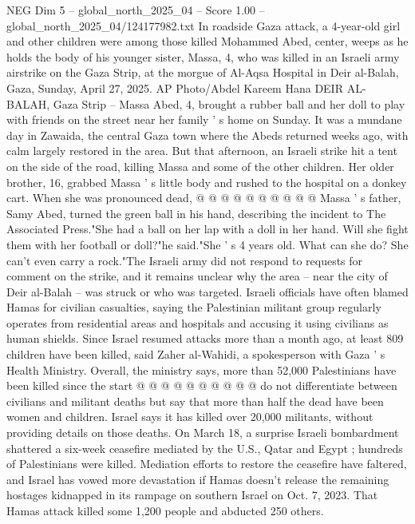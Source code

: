 \begin{textsample}{NEG Dim 5 – global\_north\_2025\_04 – Score 1.00 – global\_north\_2025\_04/124177982.txt}  \label{ex:f5_neg_342}
In roadside Gaza attack, a 4-year-old girl and other children were among those killed Mohammed Abed, center, weeps as he holds the body of his younger sister, Massa, 4, who was killed in an Israeli army airstrike on the Gaza Strip, at the morgue of Al-Aqsa Hospital in Deir al-Balah, Gaza, Sunday, April 27, 2025.
AP Photo/Abdel Kareem Hana DEIR AL-BALAH, Gaza Strip -- Massa Abed, 4, brought a rubber ball and her doll to play with friends on the street near her family ' s home on Sunday.
It was a mundane day in Zawaida, the central Gaza town where the Abeds returned weeks ago, with calm largely restored in the area.
But that afternoon, an Israeli strike hit a tent on the side of the road, killing Massa and some of the other children.
Her older brother, 16, grabbed Massa ' s little body and rushed to the hospital on a donkey cart.
When she was pronounced dead, @ @ @ @ @ @ @ @ @ @ Massa ' s father, Samy Abed, turned the green ball in his hand, describing the incident to The Associated Press."She had a ball on her lap with a doll in her hand.
Will she fight them with her football or doll?"he said."She ' s 4 years old.
What can she do?
She can't even carry a rock."The Israeli army did not respond to requests for comment on the strike, and it remains unclear why the area -- near the city of Deir al-Balah -- was struck or who was targeted.
Israeli officials have often blamed Hamas for civilian casualties, saying the Palestinian militant group regularly operates from residential areas and hospitals and accusing it using civilians as human shields.
Since Israel resumed attacks more than a month ago, at least 809 children have been killed, said Zaher al-Wahidi, a spokesperson with Gaza ' s Health Ministry.
Overall, the ministry says, more than 52,000 Palestinians have been killed since the start @ @ @ @ @ @ @ @ @ @ do not differentiate between civilians and militant deaths but say that more than half the dead have been women and children.
Israel says it has killed over 20,000 militants, without providing details on those deaths.
On March 18, a surprise Israeli bombardment shattered a six-week ceasefire mediated by the U.S., Qatar and Egypt ; hundreds of Palestinians were killed.
Mediation efforts to restore the ceasefire have faltered, and Israel has vowed more devastation if Hamas doesn't release the remaining hostages kidnapped in its rampage on southern Israel on Oct. 7, 2023.
That Hamas attack killed some 1,200 people and abducted 250 others.

\end{textsample}
